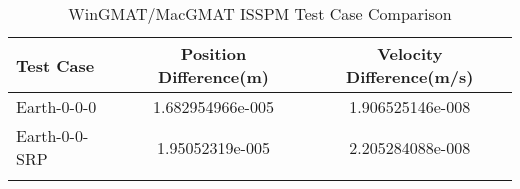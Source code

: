 \begin{table}[htbp!]
\centering
\caption{ WinGMAT/MacGMAT ISSPM Test Case Comparison}
      \begin{tabular}{lcc}
      \hline\hline
          Test Case & Position Difference(m) & Velocity Difference(m/s) \\
         \hline
         Earth-0-0-0 & 1.682954966e-005 & 1.906525146e-008 \\
         Earth-0-0-SRP & 1.95052319e-005 & 2.205284088e-008 \\
      \hline\hline
      \label{Table: ISSPM WinGMAT-MacGMAT Table} 
\end{tabular}
\end{table}
